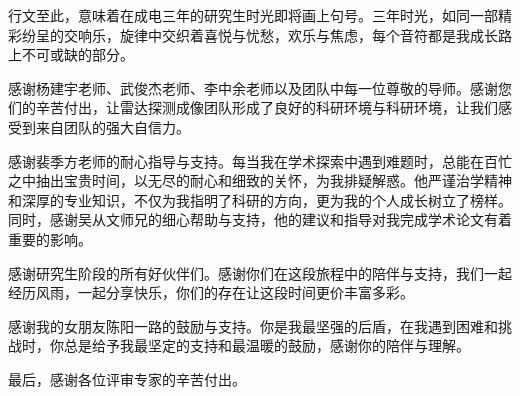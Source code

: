 \thesisacknowledgement

行文至此，意味着在成电三年的研究生时光即将画上句号。三年时光，如同一部精彩纷呈的交响乐，旋律中交织着喜悦与忧愁，欢乐与焦虑，每个音符都是我成长路上不可或缺的部分。

感谢杨建宇老师、武俊杰老师、李中余老师以及团队中每一位尊敬的导师。感谢您们的辛苦付出，让雷达探测成像团队形成了良好的科研环境与科研环境，让我们感受到来自团队的强大自信力。

感谢裴季方老师的耐心指导与支持。每当我在学术探索中遇到难题时，总能在百忙之中抽出宝贵时间，以无尽的耐心和细致的关怀，为我排疑解惑。他严谨治学精神和深厚的专业知识，不仅为我指明了科研的方向，更为我的个人成长树立了榜样。同时，感谢吴从文师兄的细心帮助与支持，他的建议和指导对我完成学术论文有着重要的影响。

感谢研究生阶段的所有好伙伴们。感谢你们在这段旅程中的陪伴与支持，我们一起经历风雨，一起分享快乐，你们的存在让这段时间更价丰富多彩。

感谢我的女朋友陈阳一路的鼓励与支持。你是我最坚强的后盾，在我遇到困难和挑战时，你总是给予我最坚定的支持和最温暖的鼓励，感谢你的陪伴与理解。

最后，感谢各位评审专家的辛苦付出。